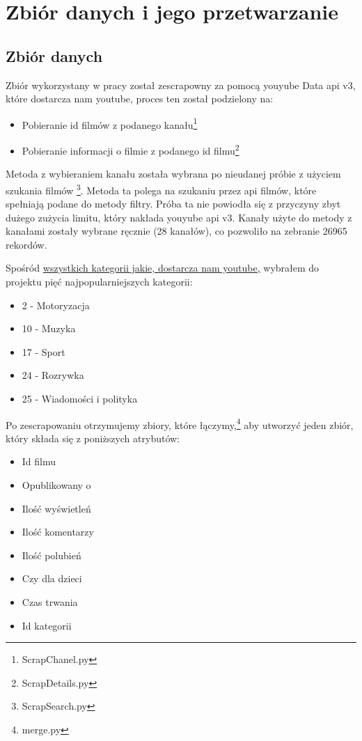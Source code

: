 \section{Zbiór danych i jego przetwarzanie}

\subsection{Zbiór danych}
\hspace{\parindent}
Zbiór wykorzystany w pracy został zescrapowny za pomocą youyube Data api v3, które dostarcza nam youtube, proces ten został podzielony na:
\begin{itemize}
  \item Pobieranie id filmów z podanego kanału\footnote{ScrapChanel.py}
  \item Pobieranie informacji o filmie z podanego id filmu\footnote{ScrapDetails.py}
\end{itemize}
Metoda z wybieraniem kanału została wybrana po nieudanej próbie z użyciem szukania filmów \footnote{ScrapSearch.py}. Metoda ta polega na szukaniu przez api filmów, które spełniają podane do metody filtry. Próba ta nie powiodła się z przyczyny zbyt dużego zużycia limitu, który nakłada youyube api v3. Kanały użyte do metody z kanałami zostały wybrane ręcznie (28 kanałów), co pozwoliło na zebranie 26965 rekordów.

Spośród
\href{https://mixedanalytics.com/blog/list-of-youtube-video-category-ids/}{wszystkich kategorii jakie, dostarcza nam youtube,}
 wybrałem do projektu pięć najpopularniejszych kategorii:


\label{kategorie}
\begin{itemize}
  \item 2 - Motoryzacja
  \item 10 - Muzyka
  \item 17 - Sport
  \item 24 - Rozrywka
  \item 25 - Wiadomości i polityka
\end{itemize}



Po zescrapowaniu otrzymujemy zbiory, które łączymy,\footnote{merge.py}
aby utworzyć jeden zbiór, który składa się z poniższych atrybutów:
\begin{itemize}
  \item Id filmu
  \item Opublikowany o
  \item Ilość wyświetleń
  \item Ilość komentarzy
  \item Ilość polubień
  \item Czy dla dzieci
  \item Czas trwania
  \item Id kategorii
\end{itemize}

